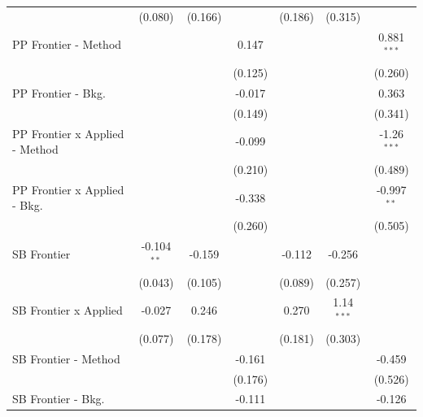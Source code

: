 \begin{tabular}{lcccccc}
                                  & (0.080)       & (0.166)       &               & (0.186)       & (0.315)        &   \\   
   PP Frontier - Method           &               &               & 0.147         &               &                & 0.881$^{***}$\\   
                                  &               &               & (0.125)       &               &                & (0.260)\\   
   PP Frontier - Bkg.             &               &               & -0.017        &               &                & 0.363\\   
                                  &               &               & (0.149)       &               &                & (0.341)\\   
   PP Frontier x Applied - Method &               &               & -0.099        &               &                & -1.26$^{***}$\\   
                                  &               &               & (0.210)       &               &                & (0.489)\\   
   PP Frontier x Applied - Bkg.   &               &               & -0.338        &               &                & -0.997$^{**}$\\   
                                  &               &               & (0.260)       &               &                & (0.505)\\   
   SB Frontier                    & -0.104$^{**}$ & -0.159        &               & -0.112        & -0.256         &   \\   
                                  & (0.043)       & (0.105)       &               & (0.089)       & (0.257)        &   \\   
   SB Frontier x Applied          & -0.027        & 0.246         &               & 0.270         & 1.14$^{***}$   &   \\   
                                  & (0.077)       & (0.178)       &               & (0.181)       & (0.303)        &   \\   
   SB Frontier - Method           &               &               & -0.161        &               &                & -0.459\\   
                                  &               &               & (0.176)       &               &                & (0.526)\\   
   SB Frontier - Bkg.             &               &               & -0.111        &               &                & -0.126\\   

\end{tabular}
